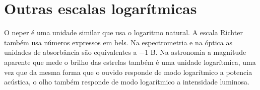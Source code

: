 \section{Outras escalas logarítmicas}
O neper é uma unidade similar que usa o logaritmo natural. A escala
Richter também usa números expressos em bels. Na espectrometria e
na óptica as unidades de absorbância são equivalentes a $ - 1 $ B. Na
astronomia a magnitude aparente que mede o brilho das estrelas
também é uma unidade logarítmica, uma vez que da mesma forma que
o ouvido responde de modo logarítmico a potencia acústica, o olho
também responde de modo logarítmico a intensidade luminosa.
